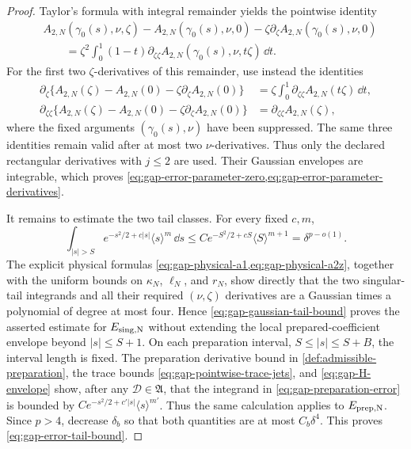 \begin{proof}
Taylor's formula with integral remainder yields the pointwise identity
\begin{align*}
 &A_{2,N}(\gamma_0(s),\nu,\zeta)
       -A_{2,N}(\gamma_0(s),\nu,0)
       -\zeta\partial_\zeta A_{2,N}(\gamma_0(s),\nu,0)\\
 &\qquad
 =\zeta^2\int_0^1(1-t)
       \partial_{\zeta\zeta}A_{2,N}
          (\gamma_0(s),\nu,t\zeta)\,\dd t.
\end{align*}
For the first two \(\zeta\)-derivatives of this remainder, use instead the
identities
\begin{align*}
 \partial_\zeta\{A_{2,N}(\zeta)-A_{2,N}(0)
                  -\zeta\partial_\zeta A_{2,N}(0)\}
 &=\zeta\int_0^1\partial_{\zeta\zeta}A_{2,N}(t\zeta)\,\dd t,\\
 \partial_{\zeta\zeta}\{A_{2,N}(\zeta)-A_{2,N}(0)
                  -\zeta\partial_\zeta A_{2,N}(0)\}
 &=\partial_{\zeta\zeta}A_{2,N}(\zeta),
\end{align*}
where the fixed arguments \((\gamma_0(s),\nu)\) have been suppressed.
The same three identities remain valid after at most two \(\nu\)-derivatives.
Thus only the declared rectangular derivatives with \(j\le2\) are used.
Their Gaussian envelopes are integrable, which proves
\cref{eq:gap-error-parameter-zero,eq:gap-error-parameter-derivatives}.

It remains to estimate the two tail classes.  For every fixed \(c,m\),
\begin{equation}
 \int_{|s|>S}e^{-s^2/2+c|s|}\langle s\rangle^m\,\dd s
 \le C e^{-S^2/2+cS}\langle S\rangle^{m+1}
 =\delta^{p-o(1)}.                                   \label{eq:gap-gaussian-tail-bound}
\end{equation}
The explicit physical formulas
\cref{eq:gap-physical-a1,eq:gap-physical-a2z}, together with the uniform
bounds on \(\kappa_N\), \(\ell_N\), and \(r_N\), show directly that the
two singular-tail integrands and all their required \((\nu,\zeta)\)
derivatives are a Gaussian times a polynomial of degree at most four.
Hence \cref{eq:gap-gaussian-tail-bound} proves the asserted estimate for
\(E_{\rm sing,N}\) without extending the local prepared-coefficient
envelope beyond \(|s|\le S+1\).  On each
preparation interval, \(S\le|s|\le S+B\), the interval length is fixed.
The preparation derivative bound in
\cref{def:admissible-preparation}, the trace bounds
\cref{eq:gap-pointwise-trace-jets}, and
\cref{eq:gap-H-envelope} show, after any
\(\mathscr D\in\mathfrak A\), that the integrand in
\cref{eq:gap-preparation-error} is bounded by
\(C e^{-s^2/2+c'|s|}\langle s\rangle^{m'}\).  Thus the same calculation
applies to \(E_{\rm prep,N}\).  Since \(p>4\), decrease \(\delta_b\) so
that both quantities are at most \(C_b\delta^4\).  This proves
\cref{eq:gap-error-tail-bound}.


\end{proof}
